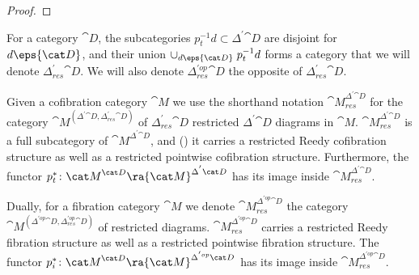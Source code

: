 \begin{proof}
\end{proof}

For a category ${\cat D}$, the subcategories $p_t^{-1}d \subset \Delta^{'}{\cat D}$ are disjoint for $d \eps {\cat D}$, and their union $\cup_{d \eps {\cat D}} \; p_t^{-1}d$ forms a category that we will denote $\Delta^{'}_{res}{\cat D}$. We will also denote $\Delta^{'op}_{res}{\cat D}$ the opposite of $\Delta^{'}_{res}{\cat D}$.

Given a cofibration category ${\cat M}$ we use the shorthand notation ${\cat M}^{\Delta^{'}{\cat D}}_{res}$ for the category  ${\cat M}^{({\Delta^{'}{\cat D}}, {\Delta^{'}_{res}{\cat D}})}$ of $\Delta^{'}_{res}{\cat D}$ restricted $\Delta^{'}{\cat D}$ diagrams in ${\cat M}$. ${\cat M}^{\Delta^{'}{\cat D}}_{res}$ is a full subcategory of ${\cat M}^{\Delta^{'}{\cat D}}$, and () it carries a restricted Reedy cofibration structure as well as a restricted pointwise cofibration structure. Furthermore, the functor $p_t^* \colon {\cat M}^{\cat D} \ra {\cat M}^{\Delta^{'}{\cat D}}$ has its image inside ${\cat M}^{\Delta^{'}{\cat D}}_{res}$.

Dually, for a fibration category ${\cat M}$ we denote ${\cat M}^{\Delta^{'op}{\cat D}}_{res}$ the category ${\cat M}^{({\Delta^{'op}{\cat D}}, {\Delta^{'op}_{res}{\cat D}})}$ of restricted diagrams. ${\cat M}^{\Delta^{'op}{\cat D}}_{res}$ carries a restricted Reedy fibration structure as well as a restricted pointwise fibration structure. The functor $p_i^* \colon {\cat M}^{\cat D} \ra {\cat M}^{\Delta^{'op}{\cat D}}$ has its image inside ${\cat M}^{\Delta^{'op}{\cat D}}_{res}$.

